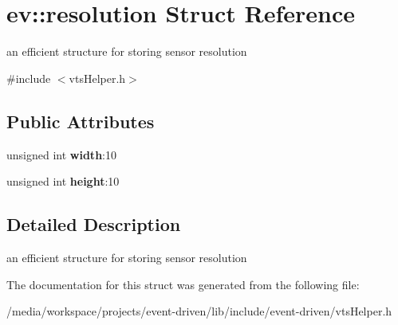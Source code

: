 \hypertarget{structev_1_1resolution}{}\section{ev\+:\+:resolution Struct Reference}
\label{structev_1_1resolution}


an efficient structure for storing sensor resolution  




{\ttfamily \#include $<$vts\+Helper.\+h$>$}

\subsection*{Public Attributes}
\begin{DoxyCompactItemize}
\item 
\mbox{\label{structev_1_1resolution_af63d9f023bf48b5170fbde6fac1fa60d}} 
unsigned int {\bfseries width}\+:10
\item 
\mbox{\label{structev_1_1resolution_ae9919e691ce05e1bbbf281dd79102ddb}} 
unsigned int {\bfseries height}\+:10
\end{DoxyCompactItemize}


\subsection{Detailed Description}
an efficient structure for storing sensor resolution 

The documentation for this struct was generated from the following file\+:\begin{DoxyCompactItemize}
\item 
/media/workspace/projects/event-\/driven/lib/include/event-\/driven/vts\+Helper.\+h\end{DoxyCompactItemize}
